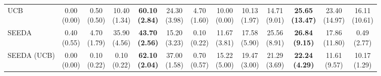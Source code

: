 \begin{table}[H]
{\begin{tabular}{l|cccccc|cccccc}
UCB & \makecell{0.00 \\ (0.00)} & \makecell{0.50 \\ (0.50)} & {\cellcolor[HTML]{C8E6C9}} \makecell{10.40 \\ (1.34)} & \bfseries \makecell{60.10 \\ (2.84)} & \makecell{24.30 \\ (3.98)} & \makecell{4.70 \\ (1.60)} & \makecell{10.00 \\ (0.00)} & \makecell{10.13 \\ (1.97)} & {\cellcolor[HTML]{C8E6C9}} \makecell{14.71 \\ (9.01)} & \bfseries \makecell{25.65 \\ (13.47)} & \makecell{23.40 \\ (14.97)} & \makecell{16.11 \\ (10.61)} \\
SEEDA & \makecell{0.40 \\ (0.55)} & \makecell{4.70 \\ (1.79)} & {\cellcolor[HTML]{C8E6C9}} \makecell{35.90 \\ (4.56)} & \bfseries \makecell{43.70 \\ (2.56)} & \makecell{15.20 \\ (3.23)} & \makecell{0.10 \\ (0.22)} & \makecell{11.67 \\ (3.81)} & \makecell{17.58 \\ (5.90)} & {\cellcolor[HTML]{C8E6C9}} \makecell{25.56 \\ (8.91)} & \bfseries \makecell{26.84 \\ (9.15)} & \makecell{17.86 \\ (11.80)} & \makecell{0.49 \\ (2.77)} \\
SEEDA (UCB) & \makecell{0.00 \\ (0.00)} & \makecell{0.10 \\ (0.22)} & {\cellcolor[HTML]{C8E6C9}} \makecell{0.10 \\ (0.22)} & \bfseries \makecell{62.10 \\ (2.04)} & \makecell{37.00 \\ (1.58)} & \makecell{0.70 \\ (0.57)} & \makecell{15.22 \\ (5.00)} & \makecell{19.47 \\ (3.00)} & {\cellcolor[HTML]{C8E6C9}} \makecell{21.29 \\ (3.69)} & \bfseries \makecell{22.24 \\ (4.29)} & \makecell{11.61 \\ (9.57)} & \makecell{10.17 \\ (1.29)} \\

\end{tabular}}
\end{table}
